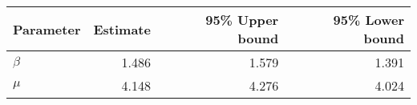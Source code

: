 \begin{tabular}{lrrr}
\toprule
Parameter &  Estimate &  95\% Upper bound &  95\% Lower bound \\
\midrule
  $\beta$ &     1.486 &             1.579 &             1.391 \\
    $\mu$ &     4.148 &             4.276 &             4.024 \\
\bottomrule
\end{tabular}
